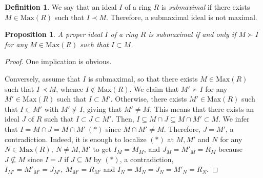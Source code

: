 \documentclass[12pt,leqno]{amsart}
\newtheorem{proposition}[theorem]{Proposition}
\theoremstyle{definition}
\newtheorem{definition}[theorem]{Definition}
\begin{document}
\begin{definition}\label{2.72}We say that an ideal $I$ of a ring $R$ is {\it submaximal} if there exists $M\in\mathrm{Max}(R)$ such that $I\prec M$.
 Therefore,  a submaximal ideal is not maximal. 
 \end{definition}

\begin{proposition}\label{2.71} A proper ideal $I$ of a ring $R$ is submaximal if and only if $M\succ I$ for any $M\in\mathrm{Max}(R)$ such that $I\subset M$.
\end{proposition}
\begin{proof} One implication is obvious. 

Conversely, assume that $I$ is submaximal, so that there exists $M\in\mathrm{Max}(R)$ such that $I\prec M$, whence $I\not\in\mathrm{Max}(R)$. We claim that $M'\succ I$ for any $M'\in\mathrm{Max}(R)$ such that $I\subset M'$. Otherwise, there exists $M'\in\mathrm{Max}(R)$ such that $I\subset M'$ with $M'\nsucc I$, giving that $M'\neq M$. This means that there exists an ideal $J$ of $R$ such that $I\subset J\subset M'$. Then, $I\subseteq M\cap J\subseteq M\cap M'\subset M$. We infer that $I=M\cap J =M\cap M'\ (*)$ since $M\cap M'\neq M$. Therefore, $J=M'$, a contradiction. Indeed, it is enough to localize $(*)$ at $M,M'$ and $N$ for any $N\in\mathrm{Max}(R),\ N\neq M,M'$ to get $I_M=M_M$, and $J_M= M'_M=R_M$ because $J\not\subseteq M$ since $I=J$ if $J\subseteq M$ by $(*)$, a contradiction, $I_{M'}=M'_{M'}=J_{M'},\ M_{M'}=R_{M'}$ and $I_N=M_N =J_N=M'_N=R_N$.
\end{proof}
  
\end{document}

